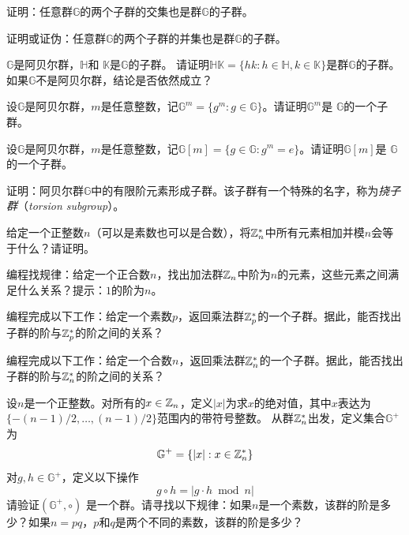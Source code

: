 \begin{problemset}
\item 证明：任意群$\mathbb{G}$的两个子群的交集也是群$\mathbb{G}$的子群。

\item 证明或证伪：任意群$\mathbb{G}$的两个子群的并集也是群$\mathbb{G}$的子群。


\item $\mathbb{G}$是阿贝尔群，$\mathbb{H}$和 $\mathbb{K}$是$\mathbb{G}$的子群。
请证明$\mathbb{H} \mathbb{K} = \{hk: h \in \mathbb{H}, k \in \mathbb{K}\}$是群$\mathbb{G}$的子群。
如果$\mathbb{G}$不是阿贝尔群，结论是否依然成立？

\item 设$\mathbb{G}$是阿贝尔群，$m$是任意整数，记$\mathbb{G}^m = \{ g^m: g\in \mathbb{G}\}$。请证明$\mathbb{G}^m$是
$\mathbb{G}$的一个子群。

\item 设$\mathbb{G}$是阿贝尔群，$m$是任意整数，记$\mathbb{G}[m] = \{ g\in \mathbb{G}: g^m = e \}$。请证明$\mathbb{G}[m]$是
$\mathbb{G}$的一个子群。 %

\item 证明：阿贝尔群$\mathbb{G}$中的有限阶元素形成子群。该子群有一个特殊的名字，称为\emph{挠子群}（\emph{torsion subgroup}）。

\item 给定一个正整数$n$（可以是素数也可以是合数），将${\mathbb Z}_n^*$中所有元素相加并模$n$会等于什么？请证明。%

\item 编程找规律：给定一个正合数$n$，找出加法群${\mathbb Z}_n$中阶为$n$的元素，这些元素之间满足什么关系？提示：$1$的阶为$n$。

\item 编程完成以下工作：给定一个素数$p$，返回乘法群${\mathbb Z}_p^*$的一个子群。据此，能否找出子群的阶与${\mathbb Z}_p^*$的阶之间的关系？

\item 编程完成以下工作：给定一个合数$n$，返回乘法群${\mathbb Z}_n^*$的一个子群。据此，能否找出子群的阶与${\mathbb Z}_n^*$的阶之间的关系？

\item 设$n$是一个正整数。对所有的$x \in {\mathbb Z}_n$，定义$\vert x \vert$为求$x$的绝对值，其中$x$表达为$\{ -(n-1)/2, \ldots, (n-1)/2\}$范围内的带符号整数。
从群${\mathbb Z}_n^*$出发，定义集合$\mathbb{G}^+$为
\[\mathbb{G}^+  = \{ \vert x \vert : x \in {\mathbb Z}_n^*\} \]
对$g, h \in \mathbb{G}^+$，定义以下操作
\[ g \circ h = \vert g \cdot h \bmod n \vert\]
请验证$(\mathbb{G}^+, \circ)$ 是一个群。请寻找以下规律：如果$n$是一个素数，该群的阶是多少？如果$n=pq$，$p$和$q$是两个不同的素数，该群的阶是多少？
\end{problemset}
